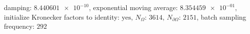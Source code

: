 damping: $\num[scientific-notation=true]{8.440601e-10}$, exponential moving average: $\num[scientific-notation=true]{8.354459e-01}$, initialize Kronecker factors to identity: $\text{yes}$, $N_{\Omega}$: $\num[scientific-notation=false]{3614}$, $N_{\partial\Omega}$: $\num[scientific-notation=false]{2151}$, batch sampling frequency: $\num[scientific-notation=false]{292}$
